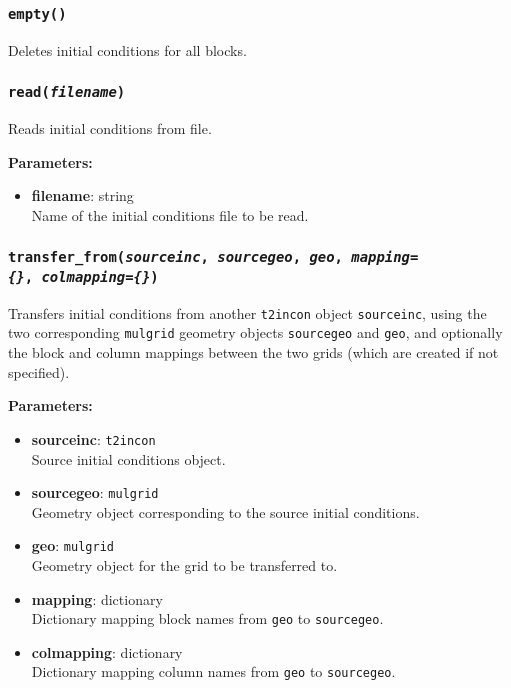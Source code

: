 \subsubsection{\texttt{empty()}}

Deletes initial conditions for all blocks.

\subsubsection{\texttt{read(\emph{filename})}}

Reads initial conditions from file.

\textbf{Parameters:}
\begin{itemize}
\item \textbf{filename}: string\\
  Name of the initial conditions file to be read.
\end{itemize}

\subsubsection{\texttt{transfer\_from(\emph{sourceinc}, \emph{sourcegeo}, \emph{geo}, \emph{mapping=\{\}},\
    \emph{colmapping=\{\}})}}

Transfers initial conditions from another \texttt{t2incon} object \texttt{sourceinc}, using the two corresponding \texttt{mulgrid} geometry objects \texttt{sourcegeo} and \texttt{geo}, and optionally the block and column mappings between the two grids (which are created if not specified).

\textbf{Parameters:}
\begin{itemize}
\item \textbf{sourceinc}: \texttt{t2incon}\\
  Source initial conditions object.
\item \textbf{sourcegeo}: \texttt{mulgrid}\\
  Geometry object corresponding to the source initial conditions.
\item \textbf{geo}: \texttt{mulgrid}\\
  Geometry object for the grid to be transferred to.
\item \textbf{mapping}: dictionary\\
  Dictionary mapping block names from \texttt{geo} to \texttt{sourcegeo}.
\item \textbf{colmapping}: dictionary\\
  Dictionary mapping column names from \texttt{geo} to \texttt{sourcegeo}.
\end{itemize}

